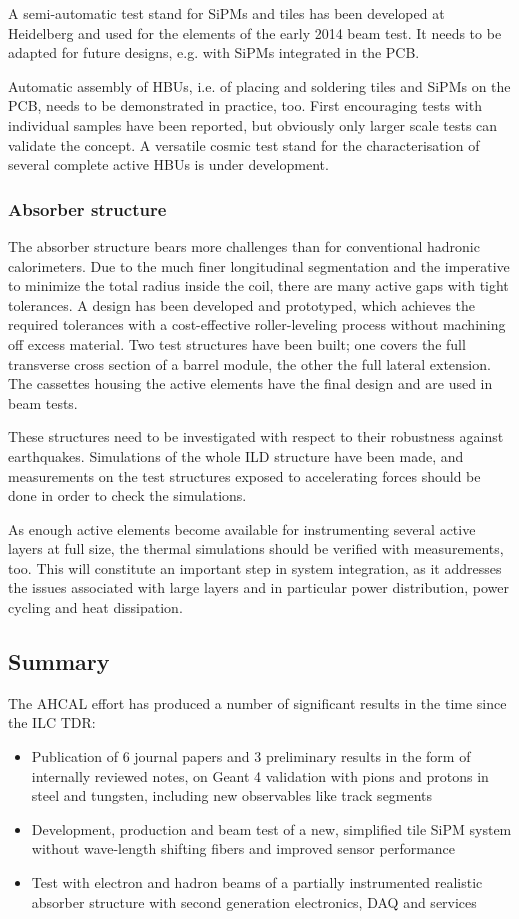 A semi-automatic test stand for SiPMs and tiles has been developed at Heidelberg and used for the elements of the early 2014 beam test. It needs to be adapted for future designs, e.g. with SiPMs integrated in the PCB.

Automatic assembly of HBUs, i.e. of placing and soldering tiles and SiPMs on the PCB, needs to be demonstrated in practice, too. First encouraging tests with individual samples have been reported, but obviously only larger scale tests can validate the concept. A versatile cosmic test stand for the characterisation of several complete active HBUs is under development.

\subsubsection{Absorber structure}

The absorber structure bears more challenges than for conventional hadronic calorimeters. Due to the much finer longitudinal segmentation and the imperative to minimize the total radius inside the coil, there are many active gaps with tight tolerances. A design has been developed and prototyped, which achieves the required tolerances with a cost-effective roller-leveling process without machining off excess material. Two test structures have been built; one covers the full transverse cross section of a barrel module, the other the full lateral extension. The cassettes housing the active elements have the final design and are used in beam tests.

These structures need to be investigated with respect to their robustness against earthquakes. Simulations of the whole ILD structure have been made, and measurements on the test structures exposed to accelerating forces should be done in order to check the simulations.

As enough active elements become available for instrumenting several active layers at full size, the thermal simulations should be verified with measurements, too. This will constitute an important step in system integration, as it addresses the issues associated with large layers and in particular power distribution, power cycling and heat dissipation.

\subsection{Summary}
The AHCAL effort has produced a number of significant results in the time since the ILC TDR:
\begin{itemize}
\item Publication of 6 journal papers and 3 preliminary results in the form of internally reviewed notes, on Geant 4 validation with pions and protons in steel and tungsten, including new observables like track segments
\item Development, production and beam test of a new, simplified tile SiPM system without wave-length shifting fibers and improved sensor performance
\item Test with electron and hadron beams of a partially instrumented realistic absorber structure  with second generation electronics, DAQ and services
\end{itemize}


